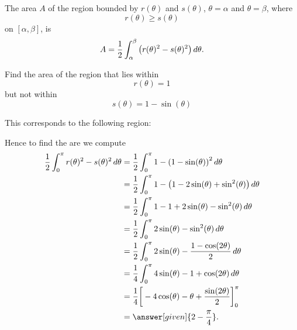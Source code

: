 \documentclass{ximera}
\begin{document}
\begin{theorem}
The area $A$ of the region bounded by $r(\theta)$ and $s(\theta)$,
$\theta=\alpha$ and $\theta=\beta$, where
\[
r(\theta)\ge s(\theta)
\]
on $[\alpha,\beta]$, is
\[
A = \frac{1}{2}\int_\alpha^\beta \big(r(\theta)^2-s(\theta)^2\big)\mathop{}\!d \theta.
\]
\end{theorem}


\begin{example}
  Find the area of the region that lies within
  \[
  r(\theta) = 1
  \]
  but not within
  \[
  s(\theta) = 1-\sin(\theta)
  \]
  \begin{explanation}
    This corresponds to the following region:
    \begin{image}
    \end{image}
    Hence to find the are we compute
    \begin{align*}
      \frac{1}{2}\int_0^{\pi} r(\theta)^2 - s(\theta)^2 \d \theta &=  \frac{1}{2}\int_0^{\pi} 1 - \left(1-\sin(\theta)\right)^2 \d \theta \\
      &=  \frac{1}{2}\int_0^{\pi} 1 - \left(1 - 2\sin(\theta) + \sin^2(\theta)\right) \d \theta \\
      &=  \frac{1}{2}\int_0^{\pi} 1 -1 + 2\sin(\theta) - \sin^2(\theta) \d \theta \\
      &=  \frac{1}{2}\int_0^{\pi} 2\sin(\theta) - \sin^2(\theta) \d \theta \\
      &=  \frac{1}{2}\int_0^{\pi} 2\sin(\theta) - \frac{1-\cos(2\theta)}{2} \d \theta \\
      &=  \frac{1}{4}\int_0^{\pi} 4\sin(\theta) - 1+\cos(2\theta) \d \theta \\
      &=  \frac{1}{4}\eval{-4\cos(\theta) - \theta+\frac{\sin(2\theta)}{2}}_0^\pi \\
      &=  \answer[given]{2-\frac{\pi}{4}}.
    \end{align*}
  \end{explanation}
\end{example}
\end{document}
